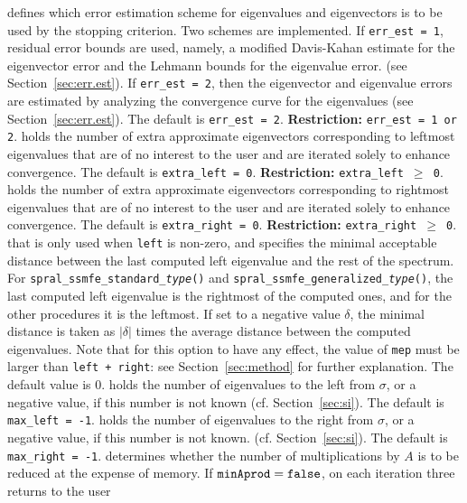 \begin{description}
%
defines which error estimation scheme 
for eigenvalues and eigenvectors
is to be used by the stopping criterion.
Two schemes are implemented.
If {\tt err\_est = 1}, residual error bounds are used,
namely,
a modified Davis-Kahan estimate for the eigenvector error
and
the Lehmann bounds for the eigenvalue error.
(see Section~\ref{sec:err.est}).
If {\tt err\_est = 2}, 
then the eigenvector and eigenvalue errors
are estimated by analyzing the convergence curve
for the eigenvalues (see Section~\ref{sec:err.est}).
The default is {\tt err\_est = 2}.
{\bf Restriction:} {\tt err\_est = 1 {\rm or} 2}.
%
holds the number of extra approximate eigenvectors
corresponding to leftmost eigenvalues
that are of no interest to the user
and are iterated solely to enhance convergence.
The default is {\tt extra\_left = 0}.
{\bf Restriction:} {\tt extra\_left $\ge$ 0}.
%
holds the number of extra approximate eigenvectors
corresponding to rightmost eigenvalues
that are of no interest to the user
and are iterated solely to enhance convergence.
The default is {\tt extra\_right = 0}.
{\bf Restriction:} {\tt extra\_right $\ge$ 0}.
%
that is only used when
{\tt left} is non-zero, and
specifies the minimal acceptable distance
between the last computed left eigenvalue
and the rest of the spectrum.
For {\tt spral\_ssmfe\_standard\_\textit{type}()} and {\tt spral\_ssmfe\_generalized\_\textit{type}()},
the last computed left eigenvalue
is the rightmost of the computed ones,
and for the other procedures
it is the leftmost.
If set to a negative value $\delta$,
the minimal distance is taken as
$|\delta|$ times the average distance between the computed eigenvalues.
Note that for this option to have any effect,
the value of {\tt mep} must be larger than
{\tt left + right}: see Section~\ref{sec:method}
for further explanation.
The default value is 0.
%
holds the number of eigenvalues to the left from $\sigma$,
or a negative value, if this number is not known
(cf. Section~\ref{sec:si}).
The default is {\tt max\_left = -1}.
%
holds the number of eigenvalues to the right from $\sigma$,
or a negative value, if this number is not known.
(cf. Section~\ref{sec:si}).
The default is {\tt max\_right = -1}.
%
determines whether the number of multiplications by $A$ 
is to be reduced at the expense of memory. 
If ${\tt minAprod = false}$, 
on each iteration three returns to the user

\end{description}
